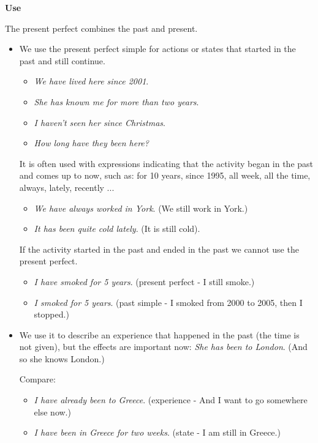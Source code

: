 \textbf{Use}

The present perfect combines the past and present. 

\begin{itemize}

\item We use the present perfect simple for actions or states that started in the past and still continue.

\begin{itemize}

\item \textit{We have lived here since 2001}.
\item \textit{She has known me for more than two years}.
\item \textit{I haven't seen her since Christmas}.
\item \textit{How long have they been here?}

\end{itemize}

It is often used with expressions indicating that the activity began in the past and comes up to now, such as: for 10 years, since 1995, all week, all the time, always, lately, recently ...

\begin{itemize}
\item \textit{We have always worked in York}. (We still work in York.) 
\item \textit{It has been quite cold lately}. (It is still cold).
\end{itemize}

If the activity started in the past and ended in the past we cannot use the present perfect.

\begin{itemize}
\item \textit{I have smoked for 5 years}. (present perfect - I still smoke.)
\item \textit{I smoked for 5 years}. (past simple - I smoked from 2000 to 2005, then I stopped.)
\end{itemize}

\item We use it to describe an experience that happened in the past (the time is not given), but the effects are important now: 
\textit{She has been to London}. (And so she knows London.)

Compare:

\begin{itemize}
\item \textit{I have already been to Greece}. (experience - And I want to go somewhere else now.)
\item \textit{I have been in Greece for two weeks}.  (state - I am still in Greece.) 
\end{itemize}


\end{itemize}
